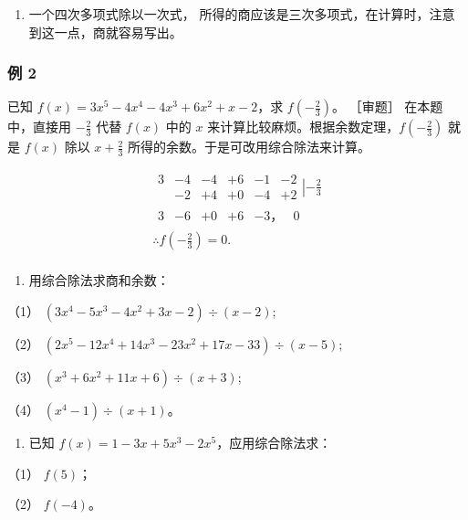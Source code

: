 \begin{enumerate}[start=2]
\item
  一个四次多项式除以一次式，
  所得的商应该是三次多项式，在计算时，注意到这一点，商就容易写出。
\end{enumerate}

\subsubsection{例 2}

已知 \(f(x) = 3x^5 - 4x^4 - 4x^3 + 6x^2 + x - 2\)，求
\(f\left(-\frac{2}{3}\right)\)。 ［审题］ 在本题中，直接用
\(-\frac{2}{3}\) 代替 \(f(x)\) 中的 \(x\)
来计算比较麻烦。根据余数定理，\(f\left(-\frac{2}{3}\right)\) 就是
\(f(x)\) 除以 \(x + \frac{2}{3}\) 所得的余数。于是可改用综合除法来计算。


\[
\begin{array}{l} \begin{array}{cccccc} 3 & - 4 & - 4 & + 6 & - 1 & - 2 \\ & - 2 & + 4 & + 0 & - 4 & + 2 \end{array} \left| - \frac {2}{3} \right. \\ \begin{array}{cccccc} 3 & - 6 & + 0 & + 6 & - 3\text{，} & 0 \end{array} \\ \therefore f \left(- \frac {2}{3}\right) = 0. \\ \end{array}
\]

\begin{enumerate}
\item
  用综合除法求商和余数：
\end{enumerate}

（1） \((3x^{4} - 5x^{3} - 4x^{2} + 3x - 2)\div (x - 2);\)

（2） \((2x^{5} - 12x^{4} + 14x^{3} - 23x^{2} + 17x - 33)\div (x - 5);\)

（3） \((x^{3} + 6x^{2} + 11x + 6)\div (x + 3);\)

（4） \((x^{4} - 1) \div (x + 1)\)。

\begin{enumerate}[start=2]
\item
  已知 \(f(x) = 1 - 3x + 5x^3 - 2x^5\)，应用综合除法求：
\end{enumerate}

（1） \(f(5)\)；

（2） \(f(-4)\)。


